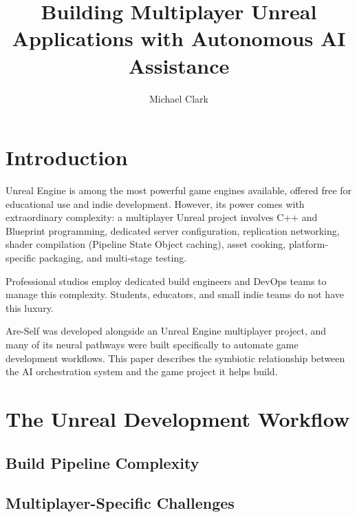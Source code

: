 \documentclass[man,12pt,floatsintext]{apa7}
\title{Building Multiplayer Unreal Applications with Autonomous AI Assistance}
\author{Michael Clark}
\affiliation{Independent Researcher \\ scipraxian}
\begin{document}
\maketitle

\section{Introduction}

Unreal Engine is among the most powerful game engines available, offered free for
educational use and indie development. However, its power comes with extraordinary
complexity: a multiplayer Unreal project involves C++ and Blueprint programming,
dedicated server configuration, replication networking, shader compilation (Pipeline
State Object caching), asset cooking, platform-specific packaging, and multi-stage
testing.

Professional studios employ dedicated build engineers and DevOps teams to manage this
complexity. Students, educators, and small indie teams do not have this luxury.

Are-Self was developed alongside an Unreal Engine multiplayer project, and many of its
neural pathways were built specifically to automate game development workflows. This paper
describes the symbiotic relationship between the AI orchestration system and the game
project it helps build.

\section{The Unreal Development Workflow}

\subsection{Build Pipeline Complexity}


\subsection{Multiplayer-Specific Challenges}

\end{document}

